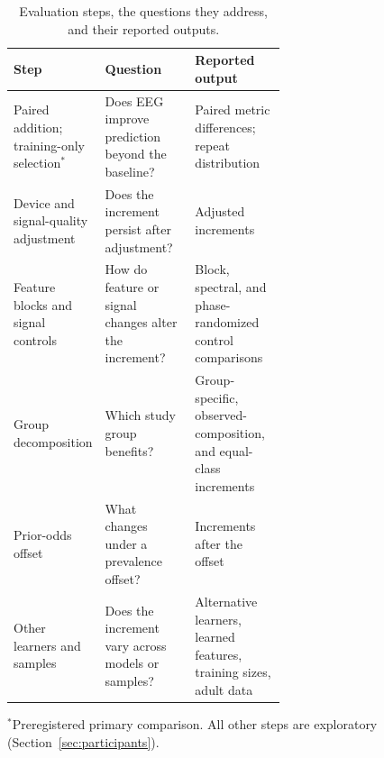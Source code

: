 \begin{table}[t]
\centering
\begin{minipage}{0.88\textwidth}
\caption{Evaluation steps, the questions they address, and their reported outputs.}
\label{tab:workflow}
\setlength{\tabcolsep}{4pt}
\renewcommand{\arraystretch}{1.03}
\begin{tabularx}{\linewidth}{@{}>{\raggedright\arraybackslash}p{0.27\linewidth}>{\raggedright\arraybackslash}p{0.33\linewidth}>{\raggedright\arraybackslash}X@{}}
\toprule
Step & Question & Reported output \\
\midrule
Paired addition; training-only selection$^{*}$ & Does EEG improve prediction beyond the baseline? & Paired metric differences; repeat distribution \\
\addlinespace[2pt]
Device and signal-quality adjustment & Does the increment persist after adjustment? & Adjusted increments \\
\addlinespace[2pt]
Feature blocks and signal controls & How do feature or signal changes alter the increment? & Block, spectral, and phase-randomized control comparisons \\
\addlinespace[2pt]
Group decomposition & Which study group benefits? & Group-specific, observed-composition, and equal-class increments \\
\addlinespace[2pt]
Prior-odds offset & What changes under a prevalence offset? & Increments after the offset \\
\addlinespace[2pt]
Other learners and samples & Does the increment vary across models or samples? & Alternative learners, learned features, training sizes, adult data \\
\bottomrule
\end{tabularx}
\par\smallskip
$^{*}$Preregistered primary comparison. All other steps are exploratory (Section~\ref{sec:participants}).
\end{minipage}
\end{table}
